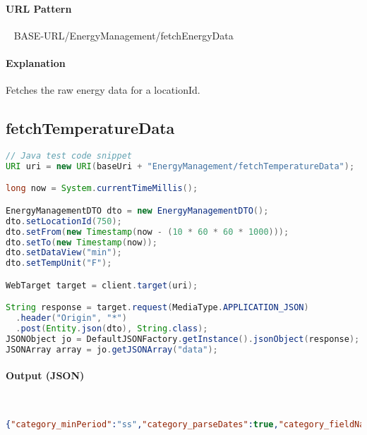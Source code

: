 \documentclass[
10pt, %
letterpaper, %
oneside, %
headinclude,footinclude, %
BCOR5mm, %
]{scrartcl}
\begin{document}
\paragraph{URL Pattern} 
~\newline
BASE-URL/EnergyManagement/fetchEnergyData

\paragraph{Explanation} Fetches the raw energy data for a locationId.


\subsection{\textbf{fetchTemperatureData}}

\begin{lstlisting}[language=Java]
// Java test code snippet
URI uri = new URI(baseUri + "EnergyManagement/fetchTemperatureData");

long now = System.currentTimeMillis();

EnergyManagementDTO dto = new EnergyManagementDTO();
dto.setLocationId(750);
dto.setFrom(new Timestamp(now - (10 * 60 * 60 * 1000)));
dto.setTo(new Timestamp(now));
dto.setDataView("min");
dto.setTempUnit("F");

WebTarget target = client.target(uri);

String response = target.request(MediaType.APPLICATION_JSON)
  .header("Origin", "*")
  .post(Entity.json(dto), String.class);
JSONObject jo = DefaultJSONFactory.getInstance().jsonObject(response);
JSONArray array = jo.getJSONArray("data");        
\end{lstlisting}

\paragraph{Output (JSON)} ~
\begin{lstlisting}[language=json]
{"category_minPeriod":"ss","category_parseDates":true,"category_fieldName":"x","data":[{"y00":74.67189107076695,"x":1404372060000},{"y00":74.67169099666543,"x":1404372120000},{"y00":74.6714909225639,"x":1404372180000},{"y00":74.67129084846239,"x":1404372240000},{"y00":74.67109077436086,"x":1404372300000},{"y00":74.67089070025935,"x":1404372360000},{"y00":74.67069062615784,"x":1404372420000},{"y00":74.67049055205632,"x":1404372480000},{"y00":74.6702904779548,"x":1404372540000},{"y00":74.67009040385327,"x":1404372600000},{"y00":74.66989032975175,"x":1404372660000},{"y00":74.66969025565024,"x":1404372720000},{"y00":74.66949018154872,"x":1404372780000}...}
\end{lstlisting}
\end{document}
